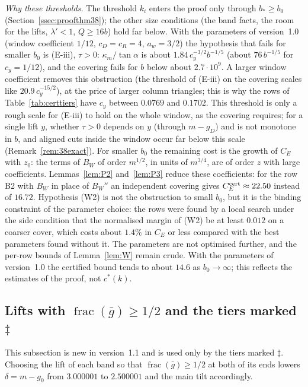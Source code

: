 \documentclass[11pt]{amsart}
\newcommand{\cs}{c^{*}}
\newcommand{\ta}{\tan\alpha}
\theoremstyle{definition}
\theoremstyle{remark}
\numberwithin{equation}{section}
\begin{document}
\emph{Why these thresholds.} The threshold $k_i$ enters the proof only through $b_*\ge b_0$
(Section~\ref{ssec:proofthm38}); the other size conditions (the band facts, the room for the lifts, $\lambda'<1$,
$Q\ge16b$) hold far below. With the parameters of version~1.0 (window coefficient $1/12$, $c_D=c_R=4$, $a_w=3/2$) the
hypothesis that fails for smaller $b_0$ is (E-iii), $\tau>0$: $\kappa_m/\ta$ is about $1.84\,c_y^{-3/2}b^{-1/5}$ (about
$76\,b^{-1/5}$ for $c_y=1/12$), and the covering fails for $b$ below about $2.7\cdot10^9$. A larger window coefficient
removes this obstruction (the threshold of (E-iii) on the covering scales like $20.9\,c_y^{-15/2}$), at the price of
larger column triangles; this is why the rows of Table~\ref{tab:certtiers} have $c_y$ between $0.0769$ and $0.1702$.
This threshold is only a rough scale for (E-iii) to hold on the whole window, as the covering requires; for a single
lift $y$, whether $\tau>0$ depends on $y$ (through $m-g_D$) and is not monotone in $b$, and aligned cuts inside the
window occur far below this scale (Remark~\ref{rem:38exact}).
For smaller $b_0$ the remaining cost is the growth of $C_E$ with $z_0$: the terms of $B_W$ of order $m^{1/2}$, in units
of $m^{3/4}$, are of order $z$ with large coefficients.
Lemmas~\ref{lem:P2} and~\ref{lem:P3} reduce these coefficients: for the row B2 with $B_W$ in place of $B_W''$ an
independent covering gives $C_E^{\rm cert}\approx22.50$ instead of $16.72$.
Hypothesis (W2) is not the obstruction to small $b_0$, but it is the binding constraint of the parameter choice: the
rows were found by a local search under the side condition that the normalised margin of (W2) be at least $0.012$ on a
coarser cover, which costs about $1.4\%$ in $C_E$ or less compared with the best parameters found without it. The
parameters are not optimised further, and the per-row bounds of Lemma~\ref{lem:W} remain crude. With the parameters of
version~1.0 the certified bound tends to about $14.6$ as $b_0\to\infty$; this reflects the estimates of the proof, not
$\cs(k)$.

\subsection{Lifts with \texorpdfstring{$\operatorname{frac}(\bar g)\ge1/2$}{frac(g)>=1/2} and the tiers marked \texorpdfstring{$\ddagger$}{double dagger}}\label{ssec:liftT2}
This subsection is new in version~1.1 and is used only by the tiers marked $\ddagger$. Choosing the lift of each band so
that $\operatorname{frac}(\bar g)\ge1/2$ at both of its ends lowers $\delta=m-g_0$ from $3.000001$ to $2.500001$ and
the main tilt accordingly.
\end{document}
